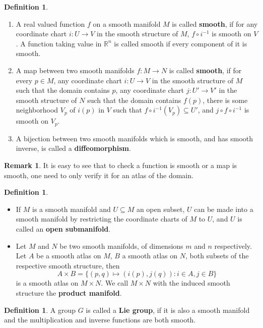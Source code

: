 \documentclass{article}
\theoremstyle{definition}
\newtheorem{dfn}[thm]{Definition}
\newtheorem{rmk}[thm]{Remark}
\begin{document}
\begin{dfn}
\begin{enumerate}
\item A real valued function $f$ on a smooth manifold $M$ is called {\bf smooth}, if for any coordinate chart $i: U\rightarrow V$ in the smooth structure of $M$, $f\circ i^{-1}$ is smooth on $V$. A function taking value in $\mathbb{R}^n$ is called smooth if every component of it is smooth.
\item A map between two smooth manifolds $f: M\rightarrow N$ is called {\bf smooth}, if for every $p\in M$, any coordinate chart $i: U\rightarrow V$ in the smooth structure of $M$ such that the domain contains $p$, any coordinate chart $j: U'\rightarrow V'$ in the smooth structure of $N$ such that the domain contains $f(p)$, there is some neighborhood $V_p$ of $i(p)$ in $V$ such that $f\circ i^{-1}(V_p)\subseteq U'$, and $j\circ f\circ i^{-1}$ is smooth on $V_p$.
\item A bijection between two smooth manifolds which is smooth, and has smooth inverse, is called a {\bf diffeomorphism}. 
\end{enumerate}
\end{dfn}

\begin{rmk}
    It is easy to see that to check a function is smooth or a map is smooth, one need to only verify it for an atlas of the domain.
\end{rmk}

\begin{dfn}
\begin{itemize}
   \item If $M$ is a smooth manifold and $U\subseteq M$ an open subset, $U$ can be made into a smooth manifold by restricting the coordinate charts of $M$ to $U$, and $U$ is called an {\bf open submanifold}.
   \item Let $M$ and $N$ be two smooth manifolds, of dimensions $m$ and $n$ respectively. Let $A$ be a smooth atlas on $M$, $B$ a smooth atlas on $N$, both subsets of the respective smooth structure, then 
    \[A\times B=\{(p, q)\mapsto (i(p), j(q)): i\in A, j\in B\}\]
    is a smooth atlas on $M\times N$. We call $M\times N$ with the induced smooth structure the {\bf product manifold}. 
    \end{itemize}
\end{dfn}

\begin{dfn}
    A group $G$ is called a {\bf Lie group}, if it is also a smooth manifold and the multiplication and inverse functions are both smooth.
\end{dfn}
\end{document}
